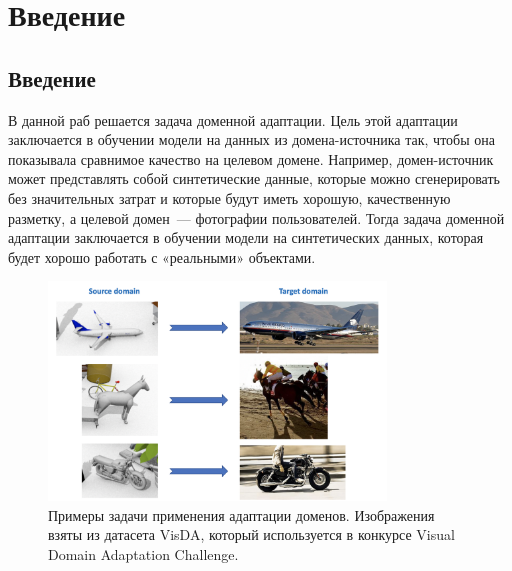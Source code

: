 \documentclass[12pt]{extarticle}
\begin{document}






\section{Введение}







\subsection{Введение}

В данной раб решается задача доменной адаптации. Цель этой адаптации заключается в обучении модели на данных из домена-источника так, чтобы она показывала сравнимое качество на целевом домене. Например, домен-источник может представлять собой синтетические данные, которые можно сгенерировать без значительных затрат и которые будут иметь хорошую, качественную разметку, а целевой домен~--- фотографии пользователей. Тогда задача доменной адаптации заключается в обучении модели на синтетических данных, которая будет хорошо работать с «реальными» объектами. 

\begin{figure}[H]
        \centering
        \includegraphics[width=0.8\textwidth]{pictures/from_source_to_target.png}
        
        \caption{Примеры задачи применения адаптации доменов. Изображения взяты из датасета VisDA, который  используется в конкурсе Visual Domain Adaptation Challenge.}
\end{figure}
\end{document}
